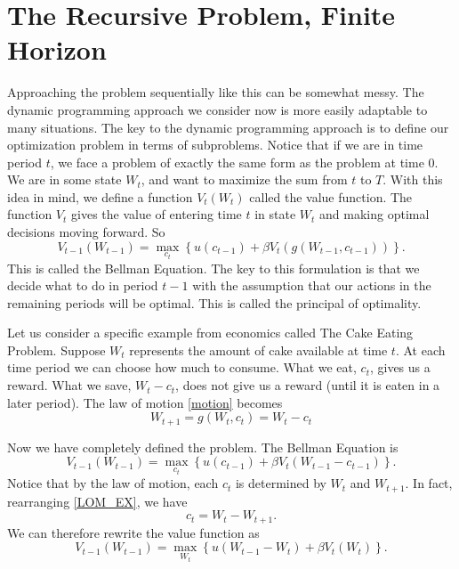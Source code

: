 \section*{The Recursive Problem, Finite Horizon}
Approaching the problem sequentially like this can be somewhat messy.  The dynamic programming approach we consider now is more
easily adaptable to many situations.  The key to the dynamic programming approach is to define our optimization problem in terms
 of subproblems.  Notice that if we are in time period $t$, we face a problem of exactly the same form as the problem at time
 $0$.  We are in some state $W_t$, and want to maximize the sum from $t$ to $T$.  With this idea in mind, we define a function
  $V_t(W_t)$ called the value function.  The function $V_t$ gives the value of entering time $t$ in state $W_t$ and making
  optimal decisions moving forward.  So
\begin{equation*}
V_{t-1}(W_{t-1}) = \max_{c_t} \left\{u(c_{t-1}) + \beta V_t(g(W_{t-1},c_{t-1}))\right\}.
\end{equation*}
This is called the Bellman Equation.  The key to this formulation is that we decide what to do in period $t-1$ with the
assumption that our actions in the remaining periods will be optimal.  This is called the principal of optimality.

Let us consider a specific example from economics called The Cake Eating Problem.  Suppose $W_t$ represents the amount of
cake available at time $t$.  At each time period we can choose how much to consume.  What we eat, $c_t$, gives us a reward.
What we save, $W_t-c_t$, does not give us a reward (until it is eaten in a later period).  The law of motion \eqref{motion}
becomes
\begin{equation}\label{LOM_EX}
W_{t+1} = g(W_t,c_t) = W_t-c_t
\end{equation}

Now we have completely defined the problem.  The Bellman Equation is
\begin{equation*}
V_{t-1}(W_{t-1}) = \max_{c_t} \left\{u(c_{t-1}) + \beta V_t(W_{t-1}-c_{t-1})\right\}.
\end{equation*}
Notice that by the law of motion, each $c_t$ is determined by $W_t$ and $W_{t+1}$.
In fact, rearranging \eqref{LOM_EX}, we have
\begin{equation*}
c_t = W_t - W_{t+1}.
\end{equation*}
We can therefore rewrite the value function as
\begin{equation}
V_{t-1}(W_{t-1}) = \max_{W_t} \left\{u(W_{t-1} - W_{t}) + \beta V_t(W_t)\right\}.
\label{cake_valfn}
\end{equation}

